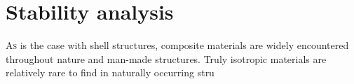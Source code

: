 



\chapter{Stability analysis}
\label{chap:chapter_2_2}

\renewcommand{\Thema}{Stability analysis}

\lettrine[lines=2]{A}{s} is the case with shell structures, composite materials are widely encountered throughout nature and man-made structures. Truly isotropic materials are relatively rare to find in naturally occurring stru